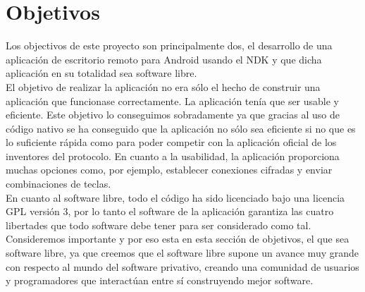 \section{Objetivos}

Los objectivos de este proyecto son principalmente dos, el desarrollo de una aplicación de escritorio remoto para Android usando el NDK y que dicha aplicación en su totalidad sea software libre.\\

El objetivo de realizar la aplicación no era sólo el hecho de construir una aplicación que funcionase correctamente. La aplicación tenía que ser usable y eficiente. Este objetivo lo conseguimos sobradamente ya que gracias al uso de código nativo se ha conseguido que la aplicación no sólo sea eficiente si no que es lo suficiente rápida como para poder competir con la aplicación oficial de los inventores del protocolo. En cuanto a la usabilidad, la aplicación proporciona muchas opciones como, por ejemplo, establecer conexiones cifradas y enviar combinaciones de teclas.\\

En cuanto al software libre, todo el código ha sido licenciado bajo una licencia GPL versión 3, por lo tanto el software de la aplicación garantiza las cuatro libertades que todo software debe tener para ser considerado como tal.\\

Consideremos importante y por eso esta en esta sección de objetivos, el que sea software libre, ya que creemos que el software libre supone un avance muy grande con respecto al mundo del software privativo, creando una comunidad de usuarios y programadores que interactúan entre sí construyendo mejor software. 
